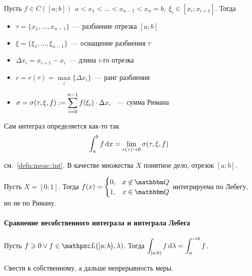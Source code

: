 \documentclass[12pt, timbord]{longnotes}
\begin{document}
\begin{defn}\label{defn:meas::rimleb::rim}
  Пусть $f\in C([a;b])\,\; a < x_1 < \dots < x_{n-1} < x_n = b,\; 
  \xi_i\in[x_i;x_{i+1}]$. Тогда 
    \begin{itemize}
      \item $\tau = \{x_1,\dots,x_{n-1}\}$~--- разбиение отрезка $[a;b]$
      \item $\xi = \{\xi_1,\dots,\xi_{n-1}\}$~--- оснащение разбиения $\tau$
      \item $\Delta x_i = x_{i+1}-x_i$~--- длина $i$-го отрезка
      \item $r=r(\tau) = \max\limits_i\{\Delta x_i\}$~--- ранг разбиения
      \item $\sigma = \sigma(\tau,\xi,f):= \displaystyle\sum\limits_{i=0}^{n-1}f(\xi_i)\cdot\Delta x_i$ ~---
        сумма Римана
    \end{itemize}
    Сам интеграл определяется как-то так 
    \[
      \int_a^b f \, \mathrm{d} x = \lim_{r(\tau)\to 0} \sigma(\tau,\xi,f)
    \]
\end{defn}

\begin{defn}\label{defn:meas::rimleb::leb}
  см.~\ref{defn:meas::int}. В качестве множества $X$ понятное дело, отрезок $[a;b]$.
\end{defn}

\begin{exmp}\label{exmp:meas::rimleb::notrim}
  Пусть $X=[0;1]$. Тогда $f(x) = \begin{cases}
    0, & x\not\in \Q \\
    1, & x\in \Q 
  \end{cases}$ интегрируема по Лебегу, но не по Риману.
\end{exmp}



\paragraph{Сравнение несобственного интеграла и интеграла Лебега}
\label{par:meas::impleb}

\begin{thrm}\label{thrm:meas::impleb}
  Пусть $f \geqslant 0 \lor f \in \summb\bigl([a;b\bigr),\lambda)$. Тогда
  $\displaystyle \int_{[a;b)} f \, \mathrm{d} \lambda = \int _a ^{\to b} f$.
\end{thrm}
\begin{tproof}\underdev
  Cвести к собственному, а дальше непрерывность меры.
\end{tproof}
\end{document}
